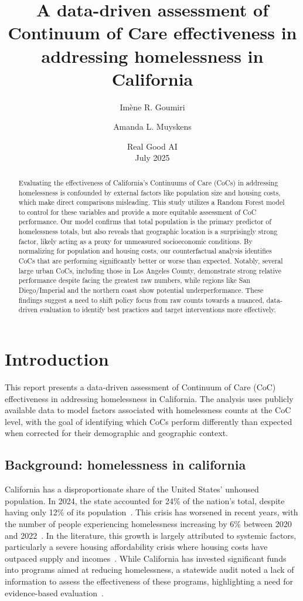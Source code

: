 \documentclass[12pt]{scrartcl}
\title{A data-driven assessment of Continuum of Care effectiveness in addressing homelessness in California}
\author{Im\`ene R. Goumiri \and Amanda L. Muyskens}
\date{Real Good AI \\[1em] July 2025}
\begin{document}
\maketitle

\begin{abstract}
Evaluating the effectiveness of California's Continuums of Care (CoCs) in addressing homelessness is confounded by external factors like population size and housing costs, which make direct comparisons misleading. This study utilizes a Random Forest model to control for these variables and provide a more equitable assessment of CoC performance. Our model confirms that total population is the primary predictor of homelessness totals, but also reveals that geographic location is a surprisingly strong factor, likely acting as a proxy for unmeasured socioeconomic conditions. By normalizing for population and housing costs, our counterfactual analysis identifies CoCs that are performing significantly better or worse than expected. Notably, several large urban CoCs, including those in Los Angeles County, demonstrate strong relative performance despite facing the greatest raw numbers, while regions like San Diego/Imperial and the northern coast show potential underperformance. These findings suggest a need to shift policy focus from raw counts towards a nuanced, data-driven evaluation to identify best practices and target interventions more effectively.
\end{abstract}


\section{Introduction}

This report presents a data-driven assessment of Continuum of Care (CoC) effectiveness in addressing homelessness in California. The analysis uses publicly available data to model factors associated with homelessness counts at the CoC level, with the goal of identifying which CoCs perform differently than expected when corrected for their demographic and geographic context.

\subsection{Background: homelessness in california}

California has a disproportionate share of the United States' unhoused population. In 2024, the state accounted for 24\% of the nation's total, despite having only 12\% of its population~\cite{ppic2025homelessness}. This crisis has worsened in recent years, with the number of people experiencing homelessness increasing by 6\% between 2020 and 2022~\cite{calich2025hdis}. In the literature, this growth is largely attributed to systemic factors, particularly a severe housing affordability crisis where housing costs have outpaced supply and incomes~\cite{ppic2025homelessness, huduser2019market}. While California has invested significant funds into programs aimed at reducing homelessness, a statewide audit noted a lack of information to assess the effectiveness of these programs, highlighting a need for evidence-based evaluation~\cite{ppic2025homelessness}.
\end{document}
